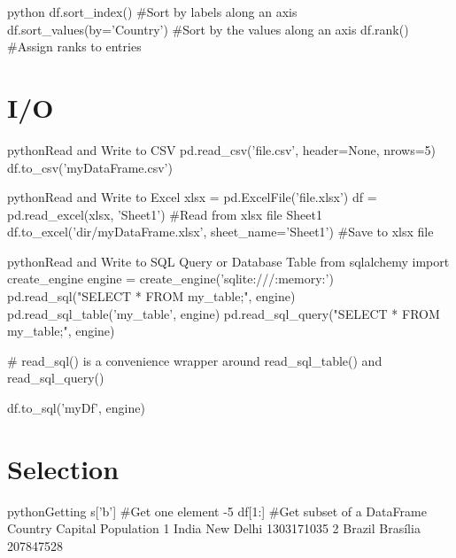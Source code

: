 \begin{codebox}{python}{}
df.sort_index()  #Sort by labels along an axis
df.sort_values(by='Country')  #Sort by the values along an axis
df.rank()  #Assign ranks to entries
\end{codebox}


\section{I/O}

\begin{codebox}{python}{Read and Write to CSV}
pd.read_csv('file.csv', header=None, nrows=5)
df.to_csv('myDataFrame.csv')
\end{codebox}

\begin{codebox}{python}{Read and Write to Excel}
xlsx = pd.ExcelFile('file.xlsx')
df = pd.read_excel(xlsx, 'Sheet1')  #Read from xlsx file Sheet1
df.to_excel('dir/myDataFrame.xlsx', sheet_name='Sheet1')  #Save to xlsx file
\end{codebox}

\begin{codebox}{python}{Read and Write to SQL Query or Database Table}
from sqlalchemy import create_engine
engine = create_engine('sqlite:///:memory:')
pd.read_sql("SELECT * FROM my_table;", engine)
pd.read_sql_table('my_table', engine)
pd.read_sql_query("SELECT * FROM my_table;", engine)

# read_sql() is a convenience wrapper around read_sql_table() and read_sql_query()

df.to_sql('myDf', engine)
\end{codebox}


\section{Selection}

\begin{codebox}{python}{Getting}
s['b']  #Get one element
-5
df[1:]  #Get subset of a DataFrame
Country Capital Population
1 India New Delhi 1303171035
2 Brazil Brasília 207847528
\end{codebox}

